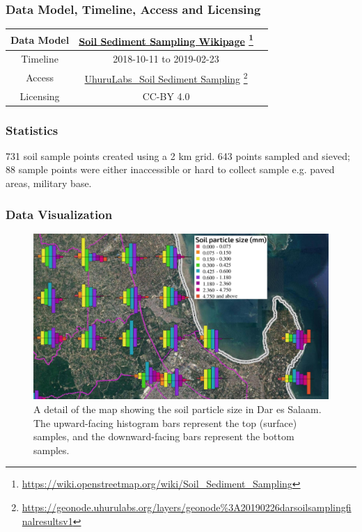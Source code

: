 \documentclass[a4paper,12pt,twoside]{article}
\begin{document}
\medskip
\subsubsection{Data Model, Timeline, Access and Licensing}
\begin{center}
  \begin{tabular}{|c|c|c|}  
 \hline
    Data Model    &   \href{https://wiki.openstreetmap.org/wiki/Soil_Sediment_Sampling}{Soil Sediment Sampling Wikipage} \footnote{\url{https://wiki.openstreetmap.org/wiki/Soil_Sediment_Sampling}} \\
 \hline
   Timeline  &   2018-10-11 to 2019-02-23 \\
 \hline  
 Access  & 
    \href{https://geonode.uhurulabs.org/layers/geonode\%3A_2019_02_26_dar_soil_sampling_final_results_v1}{UhuruLabs\_Soil Sediment Sampling} \footnote{\url{https://geonode.uhurulabs.org/layers/geonode\%3A20190226darsoilsamplingfinalresultsv1}} \\
    \hline
Licensing &  CC-BY 4.0 \\
 \hline
  
\end{tabular}
\end{center}

\subsubsection{Statistics}
731 soil sample points created using a 2 km grid. 643 points sampled and sieved; 88 sample points were either inaccessible or hard to collect sample e.g. paved areas, military base.

\subsubsection{Data Visualization}
\begin{figure}[h]
  \caption{A detail of the map showing the soil particle size in Dar es Salaam. The upward-facing histogram bars represent the top (surface) samples, and the downward-facing bars represent the bottom samples.}
  \centering
  \includegraphics[width=1\textwidth]{soil_map_detail_peninsula_with_legend}
\end{figure}
\end{document}
